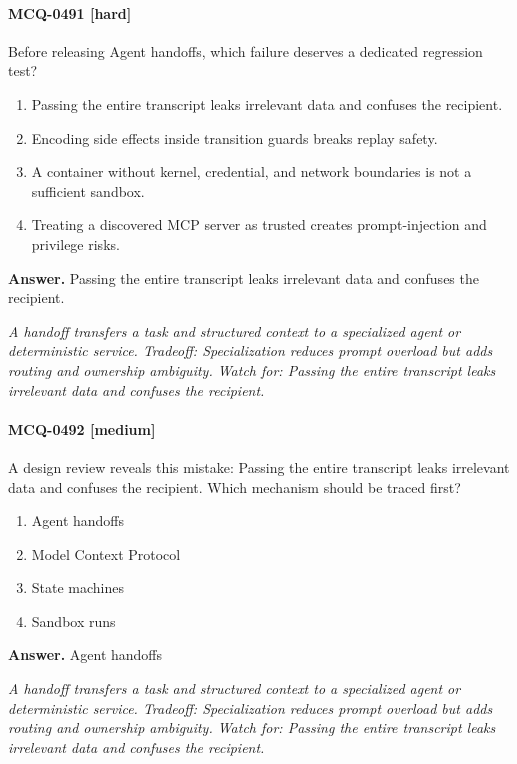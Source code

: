\paragraph{MCQ-0491 [hard]} Before releasing Agent handoffs, which failure deserves a dedicated regression test?
\begin{enumerate}[label=\Alph*.]
\item Passing the entire transcript leaks irrelevant data and confuses the recipient.
\item Encoding side effects inside transition guards breaks replay safety.
\item A container without kernel, credential, and network boundaries is not a sufficient sandbox.
\item Treating a discovered MCP server as trusted creates prompt-injection and privilege risks.
\end{enumerate}
\noindent\textbf{Answer.} Passing the entire transcript leaks irrelevant data and confuses the recipient.
\par\textit{A handoff transfers a task and structured context to a specialized agent or deterministic service. Tradeoff: Specialization reduces prompt overload but adds routing and ownership ambiguity. Watch for: Passing the entire transcript leaks irrelevant data and confuses the recipient.}
\paragraph{MCQ-0492 [medium]} A design review reveals this mistake: Passing the entire transcript leaks irrelevant data and confuses the recipient. Which mechanism should be traced first?
\begin{enumerate}[label=\Alph*.]
\item Agent handoffs
\item Model Context Protocol
\item State machines
\item Sandbox runs
\end{enumerate}
\noindent\textbf{Answer.} Agent handoffs
\par\textit{A handoff transfers a task and structured context to a specialized agent or deterministic service. Tradeoff: Specialization reduces prompt overload but adds routing and ownership ambiguity. Watch for: Passing the entire transcript leaks irrelevant data and confuses the recipient.}
